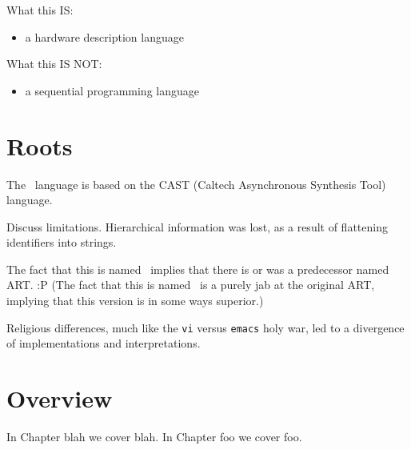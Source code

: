 What this IS:
\begin{itemize}
\item a hardware description language
\end{itemize}

What this IS NOT:
\begin{itemize}
\item a sequential programming language
\end{itemize}

\section{Roots}
\label{sec:intro:roots}

The \artxx\ language is based on the CAST
(Caltech Asynchronous Synthesis Tool) language.  

Discuss limitations.  
Hierarchical information was lost, as a result of 
flattening identifiers into strings.  

The fact that this is named \artxx\ implies that there is or was a 
predecessor named ART.  :P
(The fact that this is named \artxx\ is a purely jab at the original ART, 
implying that this version is in some ways superior.)

Religious differences, much like the
\texttt{vi} versus \texttt{emacs} holy war, 
led to a divergence of implementations and interpretations.  


\section{Overview}
\label{sec:intro:overview}

In Chapter blah we cover blah.  
In Chapter foo we cover foo.  



